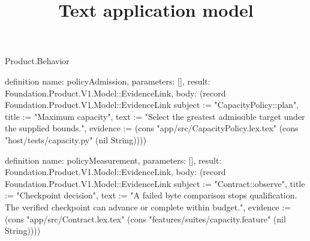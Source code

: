 \begin{lexlean}{Product.Behavior}
\title{Text application model}
\begin{semanticmodule}
definition{
  name: policyAdmission, parameters: [], result: Foundation.Product.V1.Model::EvidenceLink,
  body: (record Foundation.Product.V1.Model::EvidenceLink {subject := "CapacityPolicy::plan", title := "Maximum capacity", text := "Select the greatest admissible target under the supplied bounds.", evidence := (cons "app/src/CapacityPolicy.lex.tex" (cons "host/tests/capacity.py" (nil String)))})
}

definition{
  name: policyMeasurement, parameters: [], result: Foundation.Product.V1.Model::EvidenceLink,
  body: (record Foundation.Product.V1.Model::EvidenceLink {subject := "Contract::observe", title := "Checkpoint decision", text := "A failed byte comparison stops qualification. The verified checkpoint can advance or complete within budget.", evidence := (cons "app/src/Contract.lex.tex" (cons "features/suites/capacity.feature" (nil String)))})
}


\end{semanticmodule}
\end{lexlean}
